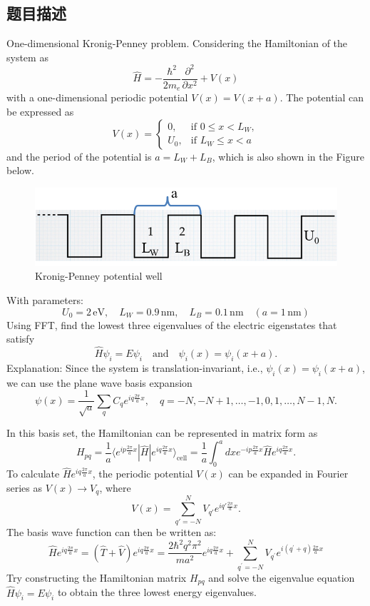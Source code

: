 \subsection{题目描述}
\noindent One-dimensional Kronig-Penney problem. Considering the Hamiltonian of the system as 
\[
\hat{H} = -\frac{\hbar^2}{2 m_e} \frac{\partial^2}{\partial x^2} + V(x)
\]
with a one-dimensional periodic potential \( V(x) = V(x + a) \). The potential can be expressed as 
\[
V(x) = 
\begin{cases}
0, & \text{if } 0  \leq x < L_W, \\
U_0, & \text{if } L_W \leq x < a
\end{cases}
\]
and the period of the potential is $a = L_W+L_B$, which is also shown in the Figure below.

\begin{figure}[H]
    \centering
    \includegraphics[width=1.0\textwidth]{Problem_1/figs/potential_well.png}
    \caption{Kronig-Penney potential well}
\end{figure}
\noindent With parameters:
\[
U_0 = 2 \, \text{eV}, \quad L_W = 0.9 \, \text{nm}, \quad L_B = 0.1 \, \text{nm} \quad (a = 1 \, \text{nm})
\]
Using FFT, find the lowest three eigenvalues of the electric eigenstates that satisfy 
\[
\hat{H} \psi_i = E \psi_i \quad \text{and} \quad \psi_i(x) = \psi_i(x + a).
\]
Explanation: Since the system is translation-invariant, i.e., \( \psi_i(x) = \psi_i(x + a) \), we can use the plane wave basis expansion 
$$ \psi(x) = \frac{1}{\sqrt{a}} \sum_q C_q e^{i q \frac{2\pi}{a} x} ,\quad q = -N, -N + 1, \dots, -1, 0, 1, \dots, N - 1, N .$$

\noindent In this basis set, the Hamiltonian can be represented in matrix form as
\[H_{pq}=\frac{1}{a}\langle e^{ip\frac{2\pi}{a}x}|\hat{H}|e^{iq\frac{2\pi}{a}x}\rangle_{\mathrm{cell}}=\frac{1}{a}\int_{0}^{a}dx e^{-ip\frac{2\pi}{a}x}\hat{H}e^{iq\frac{2\pi}{a}x}.\]
To calculate \( \hat{H} e^{i q \frac{2\pi}{a} x} \), the periodic potential \( V(x) \) can be expanded in Fourier series as \( V(x) \rightarrow V_q \), where 
\[ V(x) = \sum_{q'=-N}^{N} V_{q'} e^{i q' \frac{2\pi}{a} x} .\]
The basis wave function can then be written as:
\[\hat{H}e^{iq\frac{2\pi}{a}x}=(\hat{T}+\hat{V})e^{iq\frac{2\pi}{a}x}=\frac{2\hbar^2q^2\pi^2}{ma^2}e^{iq\frac{2\pi}{a}x}+\sum_{q^{\prime}=-N}^NV_{q^{\prime}}e^{i(q^{\prime}+q)\frac{2\pi}{a}x}\]
Try constructing the Hamiltonian matrix \( H_{pq} \) and solve the eigenvalue equation \( \hat{H} \psi_i = E \psi_i \) to obtain the three lowest energy eigenvalues.


